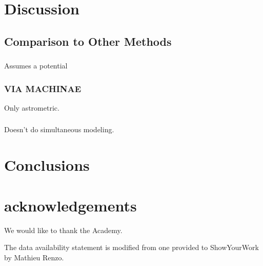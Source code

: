 \documentclass[twocolumn]{aastex631}
\begin{document}


\section{Discussion}


    \subsection{Comparison to Other Methods} \label{sec:comparison}

        \subsubsection[STREAMFINDER]{\cite{2018MNRAS.477.4063M}}
    
            Assumes a potential
    
    
        \subsubsection{VIA MACHINAE}{\cite{2022MNRAS.509.5992S}}

            Only astrometric.
    
    
        \subsubsection[Uniform Modeling of 13 Stellar Streams]{\cite{PatrickEtAl2022}}

            Doesn't do simultaneous modeling.
    


\section{Conclusions} \label{sec:conclusions}




\section{acknowledgements}

    We would like to thank the Academy.

    The data availability statement is modified from one provided to ShowYourWork by Mathieu Renzo.
\end{document}
